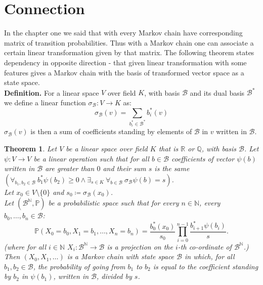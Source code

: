 \documentclass[a4paper, 12pt]{article}
\newtheorem{theorem}{Theorem}
\newcommand{\ndotsm}[3]{{#1}_{#2}, \dots, {#1}_{#3}}
\begin{document}
\section{Connection}\label{three}
\indent In the chapter one we said that with every Markov chain  have corresponding matrix of transition
probabilities. Thus with a Markov chain one can associate a certain linear transformation given by that
matrix. The following theorem states dependency in opposite direction - that given linear transformation
with some features gives a Markov chain with the basis of transformed vector space as a state space. \\[8pt]
\textbf{Definition.}
For a linear space $V$ over field $K$, with basis $\mathcal{B}$ and its dual basis $\mathcal{B}^*$
we define a linear function $\sigma_\mathcal{B} : V \to K$ as:
\begin{equation*}
    \sigma_\mathcal{B}(v)=\sum_{b_i^*\in\mathcal{B}^*}b_i^*(v)
\end{equation*}
$\sigma_\mathcal{B}(v)$ is then a sum of coefficients standing by elements of $\mathcal{B}$ in $v$
written in $\mathcal{B}$.
\begin{theorem}\label{theorem}
Let $V$ be a linear space over field $K$ that is $\mathbb{R}$ or $\mathbb{Q}$,
 with basis $\mathcal{B}$.
Let $\psi : V \to V$ be a linear operation such that for
all $b \in \mathcal{B}$ coefficients of vector $\psi(b)$ written in $\mathcal{B}$ are greater than $0$
and their
sum $s$ is the same
$(\forall_{b_1, b_2 \in \mathcal{B}}\ b_1^*\psi(b_2) \geq 0 \land \exists_{s \in K}\ \forall_{b \in
\mathcal{B}}\ \sigma_\mathcal{B}\psi(b) = s)$. \\
Let $x_0 \in V\setminus\{0 \}$ and
 $s_0 \coloneqq
\sigma_\mathcal{B}(x_0)$. \\
Let $(\mathcal{B}^\mathbb{N}, \mathbb{P})$ be a probabilistic space such that
for every $n \in \mathbb{N}$, every $\ndotsm{b}{0}{n} \in \mathcal{B}$:
\begin{equation*}
\mathbb{P}(X_0 = b_0, X_1 = b_1, \dots, X_n = b_n) =
\frac{b_0^*(x_0)}{s_0}\prod_{i = 0}^{n-1}\frac{b_{i+1}^*\psi(b_i)}{s}.
\end{equation*}
(where for all $i \in \mathbb{N}$
$X_i : \mathcal{B}^\mathbb{N} \to \mathcal{B}$ is a projection on the $i$-th co-ordinate of
$\mathcal{B}^\mathbb{N}$.) \\
Then $(X_0, X_1, \dots)$ is a Markov chain with state space $\mathcal{B}$
in which, for all $b_1, b_2 \in \mathcal{B}$, the probability of going from $b_1$ to $b_2$ is equal to the
coefficient standing by $b_2$ in $\psi(b_1)$, written in $\mathcal{B}$, divided by $s$.
\end{theorem}
\end{document}
